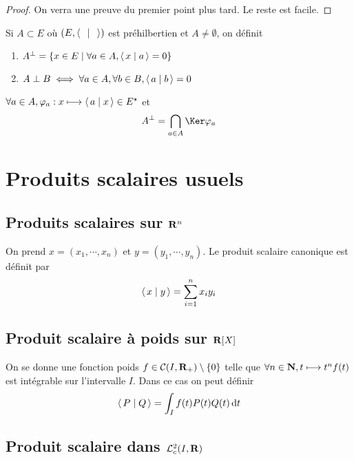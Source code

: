 \begin{proof}
On verra une preuve du premier point plus tard. Le reste est facile.
\end{proof}

\begin{dfn}
    Si $A\subset E$ où  $(E, \scalar{\;}{\;} )$ est préhilbertien et $A\neq \emptyset$, on définit \begin{enumerate}
        \item $A^\perp= \left\{  x \in  E \suchthat \forall  a \in  A, \scalar{x}{a} =0 \right\} $
        \item $A\perp B \iff  \forall  a \in  A, \forall  b \in  B, \scalar{a}{b} =0$
    \end{enumerate}
\end{dfn}

\begin{rem}
$\forall  a \in  A, \varphi_a:x \longmapsto \scalar{a}{x} \in E^\star$ et \[
A^\perp = \bigcap_{a \in  A}  \Ker \varphi_a
\] 
\end{rem}

\section{Produits scalaires usuels}

\subsection{Produits scalaires sur \texorpdfstring{$\mathbf R^n$ }{R\^{}n}}

On prend $x=(x_1, \cdots , x_n)$ et $y=(y_1, \cdots , y_n)$. Le produit scalaire canonique est définit par \[
    \scalar{x}{y} =\sum_{i=1}^nx_iy_i
\] 

\subsection{Produit scalaire à poids sur \texorpdfstring{$\mathbf R[X]$ }{R[X]}}

On se donne une fonction poids $f \in  \mathcal  C(I, \mathbf R_+)\setminus \left\{ 0 \right\} $ telle que $\forall  n \in  \mathbf N, t\longmapsto t^nf(t)$ est intégrable sur l'intervalle $I$. Dans ce cas on peut définir \[
    \scalar{P}{Q} =\int_I f(t)P(t)Q(t)\diff t
\] 

\subsection{Produit scalaire dans \texorpdfstring{$\mathcal  L_c^2(I, \mathbf R)$}{les fonctions continues de carré intégrable}}

